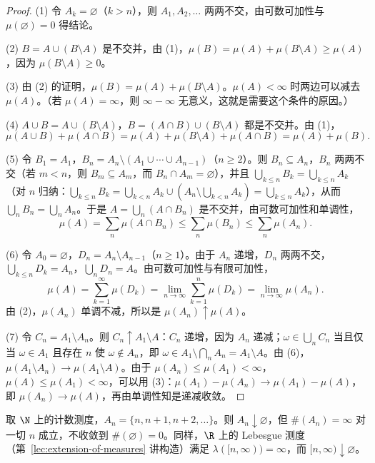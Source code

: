 \begin{proof}
(1) 令 $A_k=\varnothing$（$k>n$），则 $A_1,A_2,\dots$ 两两不交，由可数可加性与 $\mu(\varnothing)=0$ 得结论。

(2) $B=A\cup(B\setminus A)$ 是不交并，由 (1)，$\mu(B)=\mu(A)+\mu(B\setminus A)\geqslant\mu(A)$，因为 $\mu(B\setminus A)\geqslant0$。

(3) 由 (2) 的证明，$\mu(B)=\mu(A)+\mu(B\setminus A)$。$\mu(A)<\infty$ 时两边可以减去 $\mu(A)$。（若 $\mu(A)=\infty$，则 $\infty-\infty$ 无意义，这就是需要这个条件的原因。）

(4) $A\cup B=A\cup(B\setminus A)$，$B=(A\cap B)\cup(B\setminus A)$ 都是不交并。由 (1)，
\[
\mu(A\cup B)+\mu(A\cap B)=\mu(A)+\mu(B\setminus A)+\mu(A\cap B)=\mu(A)+\mu(B).
\]

(5) 令 $B_1=A_1$，$B_n=A_n\setminus(A_1\cup\cdots\cup A_{n-1})$（$n\geqslant2$）。则 $B_n\subseteq A_n$，$B_n$ 两两不交（若 $m<n$，则 $B_m\subseteq A_m$，而 $B_n\cap A_m=\varnothing$），并且 $\bigcup_{k\leqslant n}B_k=\bigcup_{k\leqslant n}A_k$（对 $n$ 归纳：$\bigcup_{k\leqslant n}B_k=\bigcup_{k<n}A_k\cup(A_n\setminus\bigcup_{k<n}A_k)=\bigcup_{k\leqslant n}A_k$），从而 $\bigcup_nB_n=\bigcup_nA_n$。于是 $A=\bigcup_n(A\cap B_n)$ 是不交并，由可数可加性和单调性，
\[
\mu(A)=\sum_n\mu(A\cap B_n)\leqslant\sum_n\mu(B_n)\leqslant\sum_n\mu(A_n).
\]

(6) 令 $A_0=\varnothing$，$D_n=A_n\setminus A_{n-1}$（$n\geqslant1$）。由于 $A_n$ 递增，$D_n$ 两两不交，$\bigcup_{k\leqslant n}D_k=A_n$，$\bigcup_nD_n=A$。由可数可加性与有限可加性，
\[
\mu(A)=\sum_{k=1}^\infty\mu(D_k)=\lim_{n\to\infty}\sum_{k=1}^n\mu(D_k)=\lim_{n\to\infty}\mu(A_n).
\]
由 (2)，$\mu(A_n)$ 单调不减，所以是 $\mu(A_n)\uparrow\mu(A)$。

(7) 令 $C_n=A_1\setminus A_n$。则 $C_n\uparrow A_1\setminus A$：$C_n$ 递增，因为 $A_n$ 递减；$\omega\in\bigcup_nC_n$ 当且仅当 $\omega\in A_1$ 且存在 $n$ 使 $\omega\notin A_n$，即 $\omega\in A_1\setminus\bigcap_nA_n=A_1\setminus A$。由 (6)，$\mu(A_1\setminus A_n)\to\mu(A_1\setminus A)$。由于 $\mu(A_n)\leqslant\mu(A_1)<\infty$，$\mu(A)\leqslant\mu(A_1)<\infty$，可以用 (3)：$\mu(A_1)-\mu(A_n)\to\mu(A_1)-\mu(A)$，即 $\mu(A_n)\to\mu(A)$，再由单调性知是递减收敛。
\end{proof}

\begin{example}[从上连续需要有限性]
取 $\N$ 上的计数测度，$A_n=\{n,n+1,n+2,\dots\}$。则 $A_n\downarrow\varnothing$，但 $\#(A_n)=\infty$ 对一切 $n$ 成立，不收敛到 $\#(\varnothing)=0$。同样，$\R$ 上的 Lebesgue 测度（第~\ref{lec:extension-of-measures} 讲构造）满足 $\lambda([n,\infty))=\infty$，而 $[n,\infty)\downarrow\varnothing$。
\end{example}


